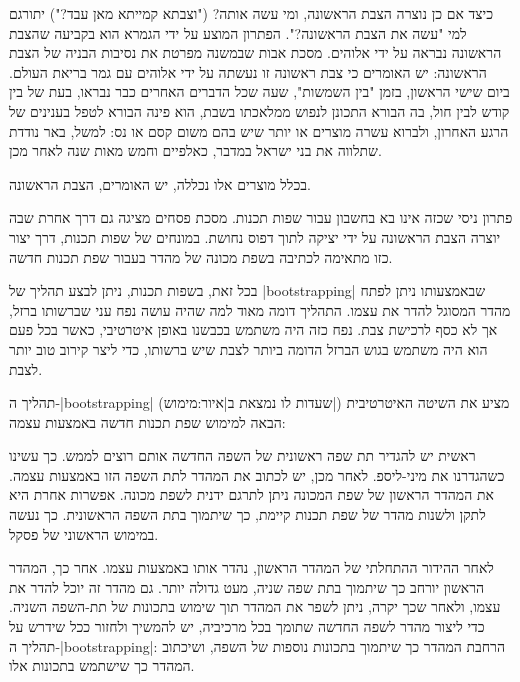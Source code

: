 כיצד אם כן נוצרה הצבת הראשונה, ומי עשה אותה? ("וצבתא קמייתא מאן עבד?") יתורגם
למי "עשה את הצבת הראשונה?". הפתרון המוצע על ידי הגמרא הוא בקביעה שהצבת הראשונה
נבראה על ידי אלוהים. מסכת אבות שבמשנה מפרטת את נסיבות הבניה של הצבת הראשונה: יש
האומרים כי צבת ראשונה זו נעשתה על ידי אלוהים עם גמר בריאת העולם. ביום שישי
הראשון, בזמן "בין השמשות", שעה שכל הדברים האחרים כבר נבראו, בעת של בין קודש לבין
חול, בה הבורא התכונן לנפוש ממלאכתו בשבת, הוא פינה הבורא לטפל בענינים
של הרגע האחרון, ולברוא עשרה מוצרים או יותר שיש בהם משום קסם או נס: למשל, באר
נודדת שתלווה את בני ישראל במדבר, כאלפיים וחמש מאות שנה לאחר מכן.

בכלל מוצרים אלו נכללה, יש האומרים, הצבת הראשונה.

פתרון ניסי שכזה אינו בא בחשבון עבור שפות תכנות. מסכת פסחים מציגה גם דרך אחרת
שבה יוצרה הצבת הראשונה על ידי יציקה לתוך דפוס נחושת. במונחים של שפות תכנות, דרך
יצור כזו מתאימה לכתיבה בשפת מכונה של מהדר בעבור שפת תכנות חדשה.

בכל זאת, בשפות תכנות, ניתן לבצע תהליך של \E|bootstrapping| שבאמצעותו ניתן לפתח
מהדר המסוגל להדר את עצמו. התהליך דומה מאוד למה שהיה עושה נפח עני שברשותו ברזל,
אך לא כסף לרכישת צבת. נפח כזה היה משתמש בכבשנו באופן איטרטיבי, כאשר בכל פעם הוא
היה משתמש בגוש הברזל הדומה ביותר לצבת שיש ברשותו, כדי ליצר קירוב טוב יותר לצבת.

תהליך ה-\E|bootstrapping| (שעדות לו נמצאת ב|איור:מימוש|) מציע את השיטה
האיטרטיבית הבאה למימוש שפת תכנות חדשה באמצעות עצמה:

ראשית יש להגדיר תת שפה ראשונית של השפה החדשה אותם רוצים לממש. כך עשינו כשהגדרנו
את מיני-ליספ. לאחר מכן, יש לכתוב את המהדר לתת השפה הזו באמצעות עצמה. את המהדר
הראשון של שפת המכונה ניתן לתרגם ידנית לשפת מכונה. אפשרות אחרת היא לתקן ולשנות מהדר
של שפת תכנות קיימת, כך שיתמוך בתת השפה הראשונית. כך נעשה במימוש הראשוני של פסקל.

לאחר ההידור ההתחלתי של המהדר הראשון, נהדר אותו באמצעות עצמו. אחר כך, המהדר
הראשון יורחב כך שיתמוך בתת שפה שניה, מעט גדולה יותר. גם מהדר זה יוכל להדר את
עצמו, ולאחר שכך יקרה, ניתן לשפר את המהדר תוך שימוש בתכונות של תת-השפה השניה.
כדי ליצור מהדר לשפה החדשה שתומך בכל מרכיביה, יש להמשיך ולחזור ככל שידרש על
תהליך ה-\E|bootstrapping|: הרחבת המהדר כך שיתמוך בתכונות נוספות של השפה,
ושיכתוב המהדר כך שישתמש בתכונות אלו.

